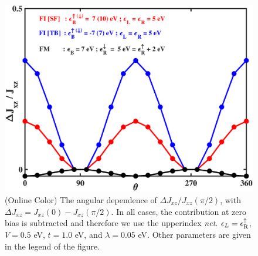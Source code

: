 \documentclass[10pt,pr,twocolumn,showpacs,amssymb,floatfix,superscriptaddress]{revtex4-1}
\newcommand{\upa}{\uparrow}
\newcommand{\eps}{\epsilon}
\begin{document}
\begin{figure}
\centering
\includegraphics[width=0.8\columnwidth,clip=false]{fig4.eps}
\caption{(Online Color) The angular dependence of $\Delta J_{xz} /J_{xz}(\pi/2)$, with $\Delta J_{xz} = J_{xz}(0) -J_{xz}(\pi/2)$. In all cases, the contribution at zero bias is subtracted and therefore we use the upperindex \textit{net}. $\eps_L = \eps_{\rm R}^\upa$, $V = 0.5$ eV, $t = 1.0$ eV, and $\lambda = 0.05$ eV. Other parameters are given in the legend of the figure.}
\label{fig:figu4}
\end{figure}
\end{document}
